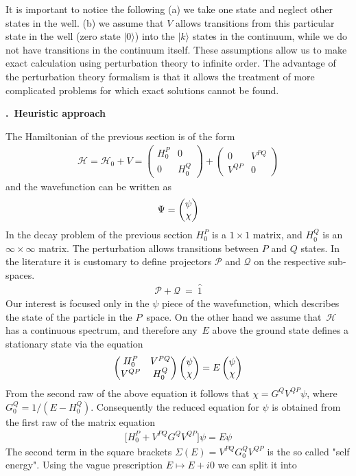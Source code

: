 \documentclass[onecolumn,fleqn, 11pt]{revtex4}
\newcommand{\amatrix}[1]{\begin{matrix} #1 \end{matrix}}
\newcommand{\beq}{\begin{eqnarray}}
\newcommand{\eeq}{\end{eqnarray}}
\renewcommand{\thesubsection}{\arabic{subsection}}
\renewcommand{\thesubsubsection}{\arabic{subsubsection}}
\newcommand{\sheadC}[1]
{
\addtocounter{subsubsection}{1}
\vspace{5mm}
{\bf \thesubsection.\thesubsubsection \ #1}  
\nopagebreak
\phantomsection
}
\begin{document}
It is important to notice the following (a) we take one state and
neglect other states in the well. (b) we assume that $V$ allows 
transitions from this particular state in the well (zero state $|0\rangle $) 
into the $|k\rangle$ states in the continuum, while we do not have transitions 
in the continuum itself. These assumptions allow us to make exact 
calculation using perturbation theory to infinite order.
The advantage of the perturbation theory formalism 
is that it allows the treatment of more complicated 
problems for which exact solutions cannot be found. 





\sheadC{Heuristic approach}

The Hamiltonian of the previous section is of the form 
\beq 
\mathcal{H} = \mathcal{H}_0 + V = 
\left( 
\begin{array}{cc} 
H_0^P & 0 \\
0 & H_0^Q 
\end{array} 
\right) 
+
\left( 
\begin{array}{cc} 
0 & V^{PQ} \\
V^{QP} & 0 
\end{array} 
\right)
\eeq
and the wavefunction can be written as 
\beq
\Psi = \left(\amatrix{\psi \cr \chi}\right) 
\eeq 
In the decay problem of the previous section $H_0^P$ is a $1\times 1$ matrix, 
and $H_0^Q$ is an $\infty\times\infty$ matrix. 
The perturbation allows transitions between $P$ and $Q$ states.
In the literature it is customary to define 
projectors $\mathcal{P}$ and $\mathcal{Q}$ on the respective sub-spaces.
\beq 
\mathcal{P}+ \mathcal{Q} \ = \ \hat{1} 
\eeq
Our interest is focused only in the $\psi$ piece 
of the wavefunction, which describes the 
state of the particle in the $P$~space.
On the other hand we assume that~$\mathcal{H}$    
has a continuous spectrum, and therefore any~$E$ 
above the ground state defines 
a stationary state via the equation
\beq
\left(\amatrix{H_0^{P} & V^{PQ} \cr V^{QP} & H_0^{Q}}\right)   
\left(\amatrix{\psi \cr \chi}\right) 
= E \left(\amatrix{\psi \cr \chi}\right) 
\eeq 
From the second raw of the above equation 
it follows that $\chi=G^{Q} V^{QP} \psi$, 
where $G_0^{Q}=1/(E-H_0^{Q})$. 
Consequently the reduced equation for $\psi$ is 
obtained from the first raw of the matrix equation 
\beq
\Big[ H_0^{P} + V^{PQ} G^{Q} V^{QP} \Big] \psi = E \psi
\eeq 
The second term in the square brackets $\Sigma(E)=V^{PQ} G_0^{Q} V^{QP}$
is the so called "self energy". Using the vague 
prescription ${E\mapsto E+i0}$  we can split it into 
\end{document}
